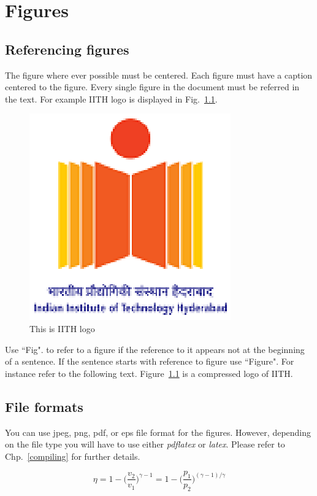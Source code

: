 \documentclass[a4paper,twoside]{iiththesis}
\begin{document}
\chapter{Figures}
\section{Referencing figures}
The figure where ever possible must be centered. Each figure must have a caption centered to the figure. Every single figure in the document must be referred in the text. For example IITH logo is displayed in Fig.~\ref{iithlogo}.

\begin{figure}[h]
\centering
\includegraphics[scale=0.5]{logo}
\caption{This is IITH logo}
\label{iithlogo}
\end{figure}

Use ``Fig". to refer to a figure if the reference to it appears not at the beginning of a sentence. If the sentence starts with reference to figure use ``Figure". For instance refer to the following text.
Figure~\ref{iithlogo} is a compressed logo of IITH.\\

\section{File formats}
You can use jpeg, png, pdf, or eps file format for the figures. However, depending on the file type you will have to use either \textit{pdflatex} or \textit{latex}. Please refer to Chp.~\ref{compiling} for further details.


\begin{equation}
\eta = 1-\bigg(\frac{v_2}{v_1}\bigg)^{\gamma-1} = 1-\bigg(\frac{p_1}{p_2}\bigg)^{(\gamma-1)/\gamma}
\end{equation}
\end{document}
